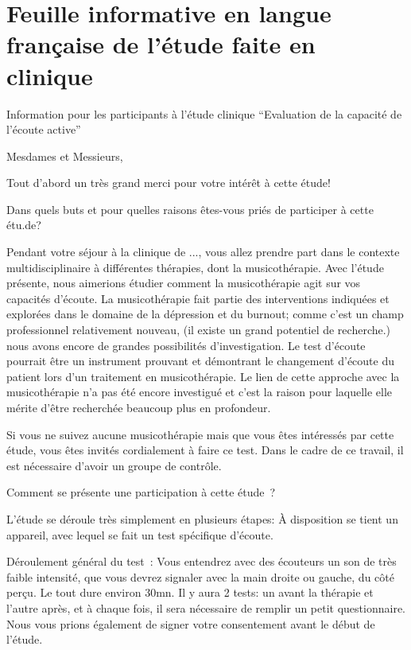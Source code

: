 
\section{Feuille informative en langue française de l'étude faite en clinique}

Information pour les participants à l'étude clinique
\foreignquote{french}{Evaluation de la capacité de l'écoute active}


Mesdames et Messieurs,

Tout d'abord un très grand merci pour votre intérêt à cette étude!

Dans quels buts et pour quelles raisons êtes-vous priés de 
par\-ti\-ci\-per à cet\-te étu\-.de?

Pendant votre séjour à la clinique de ..., vous allez prendre
part dans le contexte multidisciplinaire à différentes thérapies, dont
la musicothérapie. Avec l'étude présente, nous aimerions étudier comment
la musicothérapie agit sur vos capacités d'écoute.
La musicothérapie fait partie des interventions indiquées et explorées dans le domaine
de la dépression et du burnout; comme c'est un champ
professionnel
relativement nouveau, (il existe un grand potentiel de recherche.) nous avons encore de grandes possibilités d'investigation.
Le test d'écoute pourrait être un instrument prouvant et démontrant le changement
d'écoute du patient lors d'un traitement en musicothérapie.
Le lien de cette approche avec la musicothérapie n'a pas été encore
investigué et c'est la raison pour laquelle elle mérite d'être
recherchée beaucoup plus en profondeur.

Si vous ne suivez aucune musicothérapie mais que vous êtes intéressés
par cette étude, vous êtes invités cordialement à faire ce test. Dans
le cadre de ce travail, il est nécessaire d'avoir un groupe de contrôle.

Comment se présente une participation à cette étude ?

L'étude se déroule très simplement en plusieurs étapes:
À disposition se tient un appareil, avec lequel se fait un test spécifique d'écoute.

Déroulement général du test :
Vous entendrez  avec des écouteurs un son de très faible intensité, que
vous devrez signaler avec la main droite ou gauche, du côté
perçu.
Le tout dure environ 30mn.
Il y aura 2 tests: un avant la thérapie et l'autre après, et à chaque
fois, il sera nécessaire de remplir un petit questionnaire.
Nous vous prions également de signer votre consentement avant le début
de l'étude.



